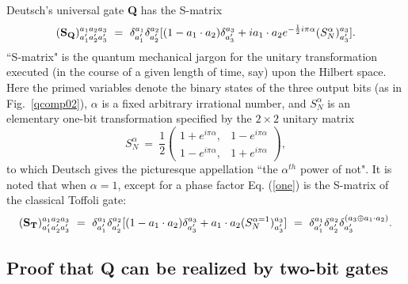 Deutsch's universal gate {\bf Q} has the S-matrix\cite{foot2}
\begin{equation}
({\bf S_Q})^{a_1a_2a_3}_{a'_1a'_2a'_3}\ =\ \delta^{a_1}_{a'_1}
\delta^{a_2}_{a'_2}[(1-a_1\cdot a_2)\delta^{a_3}_{a'_3}+ia_1\cdot a_2
e^{-\frac{1}{2}i\pi\alpha}(S^\alpha_N)^{a_3}_{a'_3}]\label{one}.
\end{equation}
``S-matrix" is the quantum mechanical jargon for the unitary transformation
executed (in the course of a given length of time, say) upon the Hilbert space.
Here the primed variables denote the binary states of the three output bits
(as in Fig.~\ref{qcomp02}),
$\alpha$ is a fixed arbitrary irrational number, and $S^\alpha_N$ is an
elementary one-bit transformation specified by the $2\times 2$ unitary matrix
\begin{equation}
S^\alpha_N\ =\ \frac{1}{2}\left(\begin{array}{cc}1+e^{i\pi\alpha},&
1-e^{i\pi\alpha}\\1-e^{i\pi\alpha},&1+e^{i\pi\alpha}\end{array}\right)
\label{two},
\end{equation}
to which Deutsch gives the
picturesque appellation ``the $\alpha^{th}$ power of not".
It is noted that
when $\alpha=1$,
except for a phase factor
Eq. (\ref{one}) is the S-matrix
of the classical Toffoli gate:
\begin{equation}
({\bf S_T})^{a_1a_2a_3}_{a'_1a'_2a'_3}\ =\ \delta^{a_1}_{a'_1}
\delta^{a_2}_{a'_2}[(1-a_1\cdot a_2)\delta^{a_3}_{a'_3}+a_1\cdot a_2
(S^{\alpha=1}_N)^{a_3}_{a'_3}]\ =\ \delta^{a_1}_{a'_1}
\delta^{a_2}_{a'_2}\delta^{(a_3\oplus a_1\cdot a_2)}_{a'_3}\label{three}.
\end{equation}

\subsection{Proof that {\bf Q} can be realized by two-bit gates}
\label{sec:level3}

